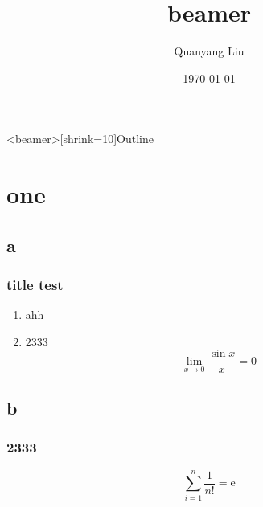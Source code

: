 \documentclass[xcolor=table,slidestop,compress,mathserif]{beamer}
\title{beamer}
\author{Quanyang Liu}
\institute{abcd}
\date{\today}
\begin{document}
\frame{\titlepage}

\begin{frame}<beamer>[shrink=10]{Outline}
  \tableofcontents[sectionstyle=show,subsectionstyle=hide]
\end{frame}

\section{one}
\subsection{a}
\begin{frame}
  \frametitle{title test}
  \begin{enumerate}
    \pause \item ahh
    \pause \item 2333
    \begin{displaymath}
      \lim_{x \to 0} \frac{ \sin x}{x} = 0
    \end{displaymath}
  \end{enumerate}
\end{frame}
\subsection{b}
\begin{frame}
  \frametitle{2333}
  \pause
  \begin{equation}
    \sum_{i=1}^n \frac{1}{n!} = \mathrm{e}
  \end{equation}
\end{frame}
\end{document}
